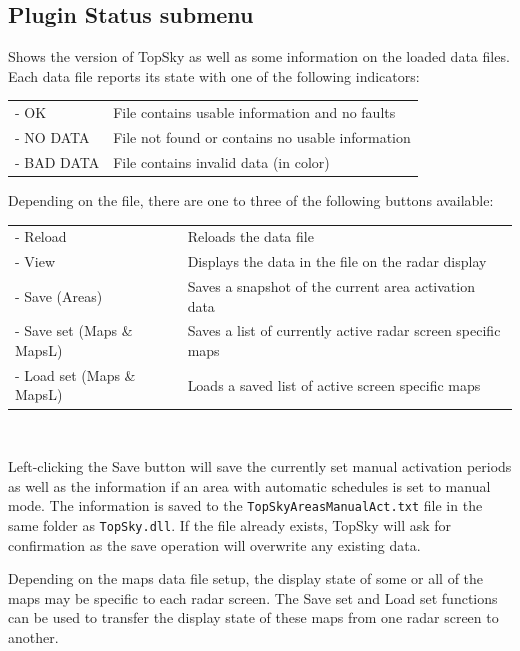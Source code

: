 \documentclass[a4paper,oneside,11pt]{memoir}
\begin{document}
\subsection*{Plugin Status submenu}
\label{menu:status}
Shows the version of TopSky as well as some information on the loaded data files. Each data file reports its state with one of the following indicators:

\bigskip

\begin{tabular}{l l}
- OK        & File contains usable information and no faults\\
- NO DATA   & File not found or contains no usable information\\
- BAD DATA  & File contains invalid data (in {Warning} color)\\
\end{tabular}

\bigskip

Depending on the file, there are one to three of the following buttons available:

\bigskip

\begin{tabular}{l l}
- Reload                    & Reloads the data file\\
- View                    & Displays the data in the file on the radar display\\
- Save (Areas)            & Saves a snapshot of the current area activation data\\
- Save set (Maps \& MapsL) & Saves a list of currently active radar screen specific maps\\
- Load set (Maps \& MapsL) & Loads a saved list of active screen specific maps\\
\end{tabular}\\ 

\bigskip

Left-clicking the Save button will save the currently set manual activation periods as well as the information if an area with automatic schedules is set to manual mode. The information is saved to the \texttt{TopSkyAreasManualAct.txt} file in the same folder as \texttt{TopSky.dll}. If the file already exists, TopSky will ask for confirmation as the save operation will overwrite any existing data. 

\bigskip

Depending on the maps data file setup, the display state of some or all of the maps may be specific to each radar screen. The Save set and Load set functions can be used to transfer the display state of these maps from one radar screen to another.
\end{document}
